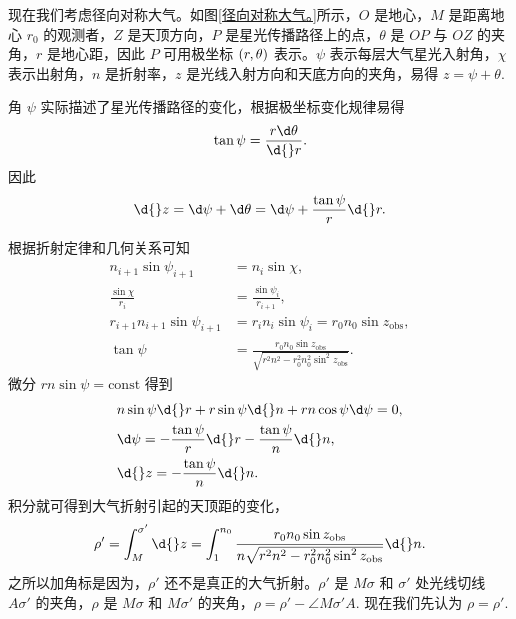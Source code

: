 \documentclass[UTF8, 12pt, a4paper, oneside, onecolumn, fontset=none]{ctexart}
\begin{document}
现在我们考虑径向对称大气。如图\ref{径向对称大气。}所示，$O$ 是地心，$M$ 是距离地心 $r_{0}$ 的观测者，$Z$ 是天顶方向，$P$ 是星光传播路径上的点，$\theta$ 是 $OP$ 与 $OZ$ 的夹角，$r$ 是地心距，因此 $P$ 可用极坐标 $\mleft(r,\theta\mright)$ 表示。$\psi$ 表示每层大气星光入射角，$\chi$ 表示出射角，$n$ 是折射率，$z$ 是光线入射方向和天底方向的夹角，易得 $z=\psi+\theta$.

角 $\psi$ 实际描述了星光传播路径的变化，根据极坐标变化规律易得
\begin{equation}
\tan{\psi}=\frac{r\d\theta}{\d{}r}.
\end{equation}
因此
\begin{equation}
\d{}z=\d\psi+\d\theta=\d\psi+\frac{\tan{\psi}}{r}\d{}r.
\end{equation}

根据折射定律和几何关系可知
\begin{align}
n_{i+1}\sin{\psi_{i+1}}&=n_{i}\sin{\chi},\\
\frac{\sin{\chi}}{r_{i}}&=\frac{\sin{\psi_{i}}}{r_{i+1}},\\
r_{i+1}n_{i+1}\sin{\psi_{i+1}}&=r_{i}n_{i}\sin{\psi_{i}}=r_{0}n_{0}\sin{z_{\mathrm{obs}}},\\
\tan{\psi}&=\frac{r_{0}n_{0}\sin{z_{\mathrm{obs}}}}{\sqrt{r^{2}n^{2}-r_{0}^{2}n_{0}^{2}\sin^{2}{z_{\mathrm{obs}}}}}.
\end{align}
微分 $rn\sin{\psi}=\mathrm{const}$ 得到
\begin{align}
&n\sin{\psi}\d{}r+r\sin{\psi}\d{}n+rn\cos{\psi}\d\psi=0,\notag\\
&\d\psi=-\frac{\tan{\psi}}{r}\d{}r-\frac{\tan{\psi}}{n}\d{}n,\notag\\
&\d{}z=-\frac{\tan{\psi}}{n}\d{}n.
\end{align}
积分就可得到大气折射引起的天顶距的变化，
\begin{equation}
\rho'=\int_{M}^{\sigma'}\d{}z=\int_{1}^{n_{0}}\frac{r_{0}n_{0}\sin{z_{\mathrm{obs}}}}{n\sqrt{r^{2}n^{2}-r_{0}^{2}n_{0}^{2}\sin^{2}{z_{\mathrm{obs}}}}}\d{}n.\label{2.2.8}
\end{equation}
之所以加角标是因为，$\rho'$ 还不是真正的大气折射。$\rho'$ 是 $M\sigma$ 和 $\sigma'$ 处光线切线 $A\sigma'$ 的夹角，$\rho$ 是 $M\sigma$ 和 $M\sigma'$ 的夹角，$\rho=\rho'-\angle{M\sigma'A}$. 现在我们先认为 $\rho=\rho'$.
\end{document}
